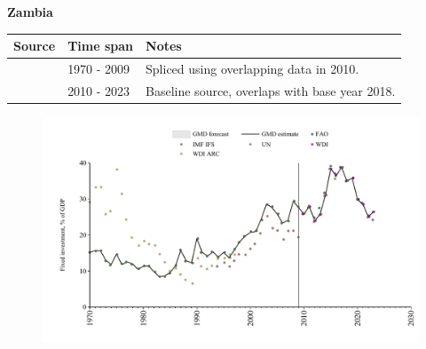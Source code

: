 \documentclass[12pt,a4paper,landscape]{article}
\begin{document}
\begin{adjustbox}{max totalsize={\paperwidth}{\paperheight},center}
\begin{minipage}[t][\textheight][t]{\textwidth}
\vspace*{0.5cm}
{}
\begin{center}
{\Large\bfseries Zambia}
\end{center}
\vspace{0.5cm}
\begin{table}[H]
\centering
\small
\begin{tabular}{|l|l|l|}
\hline
\textbf{Source} & \textbf{Time span} & \textbf{Notes} \\
\hline
\rowcolor{white}\cite{UN}& 1970 - 2009 &Spliced using overlapping data in 2010.\\
\rowcolor{lightgray}\cite{WDI}& 2010 - 2023 &Baseline source, overlaps with base year 2018.\\
\hline
\end{tabular}
\end{table}
\begin{figure}[H]
\centering
\includegraphics[width=\textwidth,height=0.6\textheight,keepaspectratio]{graphs/ZMB_finv_GDP.pdf}
\end{figure}
\end{minipage}
\end{adjustbox}
\end{document}
